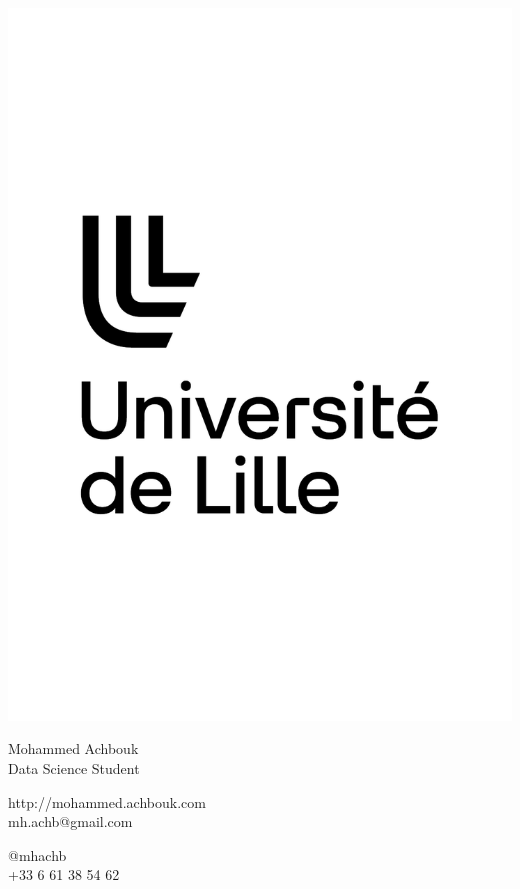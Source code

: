 \documentclass{article}
\begin{document}
\centering \includegraphics[width=.25\linewidth]{logo}\\[5pt]
\parbox{2in}{\Large \centering Mohammed Achbouk\\[1pt]
\normalsize Data Science Student}

\vfill
\raggedright
\begin{multicols}{2}
http://mohammed.achbouk.com\\
mh.achb@gmail.com

\columnbreak
\raggedleft
@mhachb\\
+33 6 61 38 54 62%
\end{multicols}%
\end{document}
